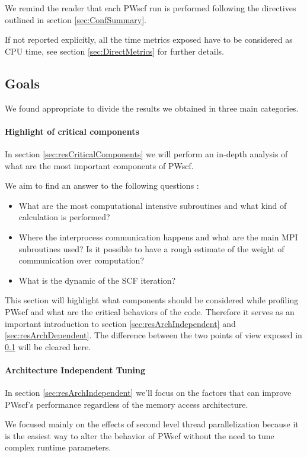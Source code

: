 \documentclass[a4paper,12pt]{article}
\begin{document}
We remind the reader that each PWscf run is performed following the directives outlined in section \ref{sec:ConfSummary}.

If not reported explicitly, all the time metrics exposed have to be considered as CPU time, see section \ref{sec:DirectMetrics} for further details.

\newpage

\subsection{Goals}\label{sec:Goals}
We found appropriate to divide the results we obtained in three main categories.

\paragraph{Highlight of critical components} 
In section \ref{sec:resCriticalComponents} we will perform an in-depth analysis of what are the most important components of PWscf.

We aim to find an answer to the following questions :
\begin{itemize}
	\item What are the most computational intensive subroutines and what kind of calculation is performed?
	\item Where the interprocess communication happens and what are the main MPI subroutines used? Is it possible to have a rough estimate of the weight of communication over computation?
	\item What is the dynamic of the SCF iteration? 	
\end{itemize}

This section will highlight what components should be considered while profiling PWscf and what are the critical behaviors of the code. 
Therefore it serves as an important introduction to section \ref{sec:resArchIndependent} and \ref{sec:resArchDependent}. The difference between the two points of view exposed in \ref{sec:Goals} will be cleared here.



\paragraph{Architecture Independent Tuning}
In section \ref{sec:resArchIndependent} we'll focus on the factors that can improve PWscf's performance regardless of the memory access architecture.

We focused mainly on the effects of second level thread parallelization because it is the easiest way to alter the behavior of PWscf without the need to tune complex runtime parameters.
\end{document}
